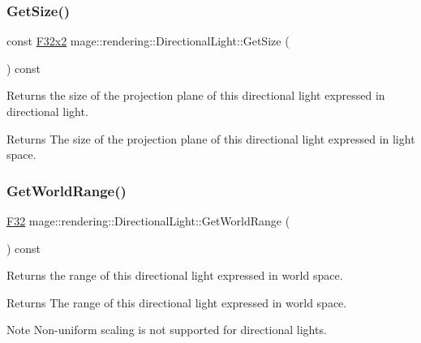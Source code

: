 \subsubsection{\texorpdfstring{Get\+Size()}{GetSize()}}
{\footnotesize\ttfamily const \mbox{\hyperlink{namespacemage_a9dc0d34d6ecc87e4cfa4a826102117bc}{F32x2}} mage\+::rendering\+::\+Directional\+Light\+::\+Get\+Size (\begin{DoxyParamCaption}{ }\end{DoxyParamCaption}) const\hspace{0.3cm}{\ttfamily [noexcept]}}

Returns the size of the projection plane of this directional light expressed in directional light.

\begin{DoxyReturn}{Returns}
The size of the projection plane of this directional light expressed in light space. 
\end{DoxyReturn}
\mbox{\label{classmage_1_1rendering_1_1_directional_light_a62e8286172a0fe23878f23de2dded6cb}} 
\subsubsection{\texorpdfstring{Get\+World\+Range()}{GetWorldRange()}}
{\footnotesize\ttfamily \mbox{\hyperlink{namespacemage_aa97e833b45f06d60a0a9c4fc22ae02c0}{F32}} mage\+::rendering\+::\+Directional\+Light\+::\+Get\+World\+Range (\begin{DoxyParamCaption}{ }\end{DoxyParamCaption}) const\hspace{0.3cm}{\ttfamily [noexcept]}}

Returns the range of this directional light expressed in world space.

\begin{DoxyReturn}{Returns}
The range of this directional light expressed in world space. 
\end{DoxyReturn}
\begin{DoxyNote}{Note}
Non-\/uniform scaling is not supported for directional lights. 
\end{DoxyNote}
\mbox{\label{classmage_1_1rendering_1_1_directional_light_aa81fa39a4d068d879a6d90587ee324d8}} 
